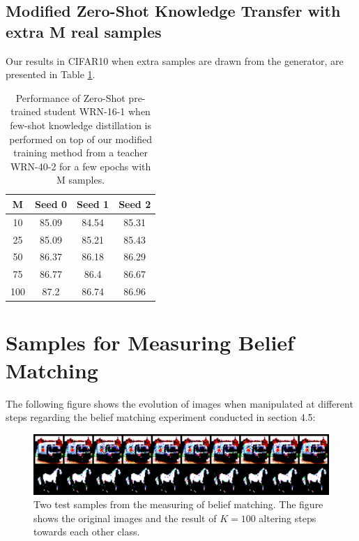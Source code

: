 \subsection{Modified Zero-Shot Knowledge Transfer with extra M real samples}

Our results in CIFAR10 when extra samples are drawn from the generator, are presented in Table \ref{tab:modified_zeroShot_KDatt_cifar}.

\begin{table}[!h]
    \centering
    \begin{tabular}{c|ccc}
    \toprule
    \toprule
         \textbf{M} & \textbf{Seed 0} & \textbf{Seed 1} & \textbf{Seed 2} \\
         \midrule
         10 & 85.09 & 84.54 & 85.31 \\
         25 & 85.09 & 85.21 & 85.43 \\
         50 & 86.37 & 86.18 & 86.29 \\
         75 & 86.77 & 86.4  & 86.67 \\
         100 & 87.2 & 86.74 & 86.96\\
         \bottomrule
         \bottomrule
    \end{tabular}
    \vspace{0.25cm}
    \caption{Performance of Zero-Shot pre-trained student WRN-16-1 when few-shot knowledge distillation is performed on top of our modified training method from a teacher WRN-40-2 for a few epochs with M samples.}
    \label{tab:modified_zeroShot_KDatt_cifar}
\end{table}

\newpage
\section{Samples for Measuring Belief Matching}

The following figure shows the evolution of images when manipulated at different steps regarding the belief matching experiment conducted in section 4.5:

\begin{figure}[H]
   \centering
   \includegraphics[width=120mm]{images/KD-sample2-class97.png}
   \caption{Two test samples from the measuring of belief matching. The figure shows the original images and the result of $K=100$ altering steps towards each other class.}
  \label{manipulateSamples}
\end{figure}

